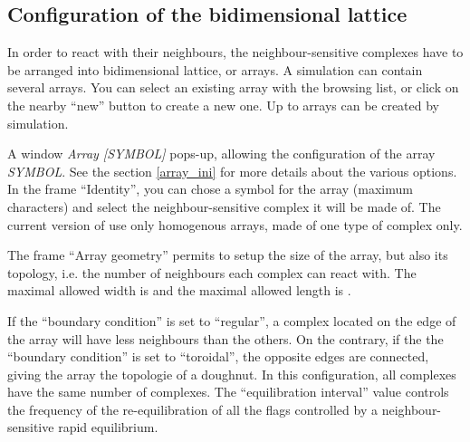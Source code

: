 \subsection{Configuration of the bidimensional lattice}\label{arrays}

In order to react with their neighbours, the neighbour-sensitive complexes have
to be arranged into bidimensional lattice, or arrays. A simulation can contain
several arrays. You can select an existing array with the browsing list, or
click on the nearby ``new'' button to create a new one. Up to 
\MAXNUMCOMPLEXARRAYS{} arrays can be created by simulation.

 A window \emph{Array
  [SYMBOL]} pops-up, allowing the configuration of the array \emph{SYMBOL}.  See
the section \ref{array_ini} for more details about the various options.  In the
frame ``Identity'', you can chose a symbol for the array (maximum
\MAXARRAYNAMELENGTH{} characters) and select the neighbour-sensitive complex it
will be made of.  The current version of \stochsim{} use only homogenous arrays,
made of one type of complex only.

The
frame ``Array geometry'' permits to setup the size of the array, but also its
topology, i.e. the number of neighbours each complex can react with. The maximal
allowed width is \MAXARRAYWIDTH{} and the maximal allowed length is
\MAXARRAYLENGTH{}.

If the ``boundary condition'' is set to ``regular'', a complex located on the
edge of the array will have less neighbours than the others. On the contrary,
if the the ``boundary condition'' is set to ``toroidal'', the opposite edges
are connected, giving the array the topologie of a doughnut. In this
configuration, all complexes have the same number of complexes.  The
``equilibration interval'' value controls the frequency of the re-equilibration
of all the flags controlled by a neighbour-sensitive rapid equilibrium.

